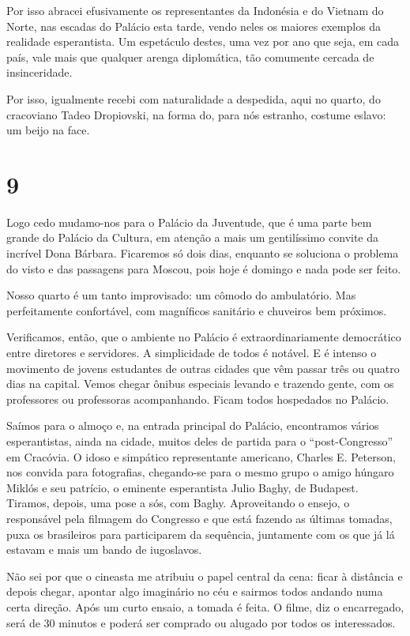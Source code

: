 Por isso abracei efusivamente os representantes da Indonésia e do Vietnam do Norte, nas escadas do Palácio esta tarde, vendo neles os maiores exemplos da realidade esperantista. Um espetáculo destes, uma vez por ano que seja, em cada país, vale mais que qualquer arenga diplomática, tão comumente cercada de insinceridade.

Por isso, igualmente recebi com naturalidade a despedida, aqui no quarto, do cracoviano Tadeo Dropiovski, na forma do, para nós estranho, costume eslavo: um beijo na face.

\section*{9 \adfflatleafright {}}
Logo cedo mudamo-nos para o Palácio da Juventude, que é uma parte bem grande do Palácio da Cultura, em atenção a mais um gentilíssimo convite da incrível Dona Bárbara. Ficaremos só dois dias, enquanto se soluciona o problema do visto e das passagens para Moscou, pois hoje é domingo e nada pode ser feito.

Nosso quarto é um tanto improvisado: um cômodo do ambulatório. Mas perfeitamente confortável, com magníficos sanitário e chuveiros bem próximos.

Verificamos, então, que o ambiente no Palácio é extraordinariamente democrático entre diretores e servidores. A simplicidade de todos é notável. E é intenso o movimento de jovens estudantes de outras cidades que vêm passar três ou quatro dias na capital. Vemos chegar ônibus especiais levando e trazendo gente, com os professores ou professoras acompanhando. Ficam todos hospedados no Palácio.

Saímos para o almoço e, na entrada principal do Palácio, encontramos vários esperantistas, ainda na cidade, muitos deles de partida para o ``post-Congresso'' em Cracóvia. O idoso e simpático representante americano, Charles E. Peterson, nos convida para fotografias, chegando-se para o mesmo grupo o amigo húngaro Miklós e seu patrício, o eminente esperantista Julio Baghy, de Budapest. Tiramos, depois, uma pose a sós, com Baghy. Aproveitando o ensejo, o responsável pela filmagem do Congresso e que está fazendo as últimas tomadas, puxa os brasileiros para participarem da sequência, juntamente com os que já lá estavam e mais um bando de iugoslavos.

Não sei por que o cineasta me atribuiu o papel central da cena: ficar à distância e depois chegar, apontar algo imaginário no céu e sairmos todos andando numa certa direção. Após um curto ensaio, a tomada é feita. O filme, diz o encarregado, será de 30 minutos e poderá ser comprado ou alugado por todos os interessados.

